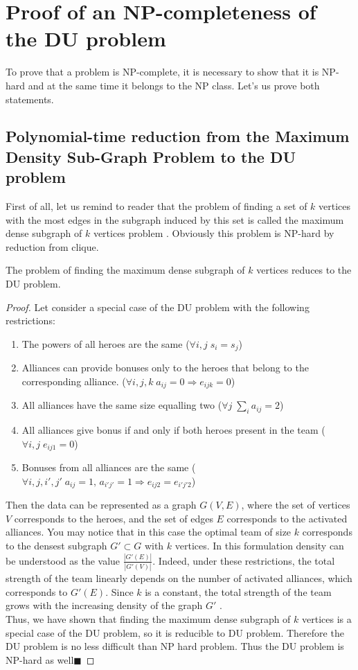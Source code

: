 \documentclass[smallextended]{svjour3}       %
\begin{document}
\section{Proof of an NP-completeness of the DU problem}
\label{SectionNPCompleteProof}
To prove that a problem is NP-complete, it is necessary to show that it is NP-hard  and at the same time it belongs to the NP class. Let's us prove both statements.
\subsection{Polynomial-time reduction from the Maximum Density Sub-Graph Problem to the DU problem}
First of all, let us remind to reader that the problem of finding a set of $k$ vertices with the most edges in the subgraph induced by this set is called the maximum dense subgraph of $k$ vertices problem \cite{kortsarz1993choosing}.  Obviously this problem is NP-hard by reduction from clique. 
\begin{theorem}
\label{MEWC_DU}
The problem of finding the maximum dense subgraph of $k$ vertices reduces to the DU problem.
\end{theorem}
\begin{proof}
Let consider a special case of the DU problem with the following restrictions:
\begin{enumerate}
    \item The powers of all heroes are the same ($\forall i, j \; s_i=s_j$)
    \item Alliances can provide bonuses only to the heroes that belong to the corresponding alliance. ($\forall i, j, k \; a_{ij}=0 \Longrightarrow e_{ijk} = 0$)
    \item All alliances have the same size equalling two ($\forall j \; \sum_i a_{ij}=2 $)
    \item All alliances give bonus if and only if both heroes present in the team ($\forall i, j \; e_{ij1}=0$)
    \item Bonuses from all alliances are the same ($\forall i, j, i', j' \; a_{ij}=1,\, a_{i' j'}=1 \Longrightarrow e_{ij2}=e_{i' j' 2}$)
\end{enumerate}
Then the data can be represented as a graph $G(V, E) $, where the set of vertices $ V $ corresponds to the heroes, and the set of edges $E$ corresponds to the activated alliances. You may notice that in this case the optimal team of size $ k $ corresponds to the densest subgraph $ G' \subset G $ with $ k $ vertices.  In this formulation density can be understood as the value $ \frac{|G'(E)|}{|G'(V)|} $. Indeed, under these restrictions, the total strength of the team linearly depends on the number of activated alliances, which corresponds to $ G'(E)$. Since $ k $ is a constant, the total strength of the team grows with the increasing density of the graph $ G '$ .\\
Thus, we have shown that finding the maximum dense subgraph of $k$ vertices is a special case of the DU problem, so it is reducible to DU problem. Therefore the DU problem is no less difficult than NP hard  problem. Thus the DU problem is NP-hard as well$\blacksquare$
\end{proof}
\end{document}
